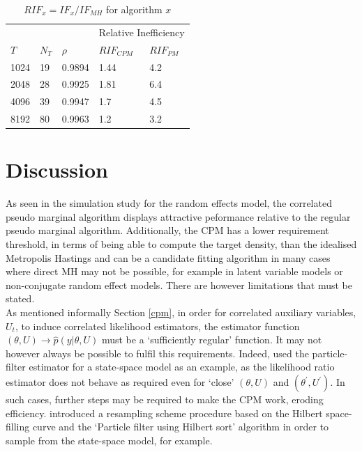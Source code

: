 \documentclass{article}
\begin{document}
\begin{table}[H]
\centering
\begin{tabular}{|l|ll|ll|}
\hline
     & \multicolumn{2}{l|}{} & \multicolumn{2}{l|}{Relative Inefficiency} \\
$T$  & $N_T$     & $\rho$    & $RIF_{CPM}$               & $RIF_{PM}$              \\ \hline
1024 & 19        & 0.9894    & 1.44                      & 4.2                     \\
2048 & 28        & 0.9925    & 1.81                      & 6.4                     \\
4096 & 39        & 0.9947    & 1.7                       & 4.5                     \\
8192 & 80        & 0.9963    & 1.2                       & 3.2                     \\ \hline
\end{tabular}
\caption{$RIF_x = IF_x/ IF_{MH}$ for algorithm $x$}
\label{tab:RIF}
\end{table}

  \section{Discussion}

As seen in the simulation study for the random effects model, the correlated pseudo marginal algorithm displays attractive peformance relative to the regular pseudo marginal algorithm. Additionally, the CPM has a lower requirement threshold, in terms of being able to compute the target density, than the idealised Metropolis Hastings and can be a candidate fitting algorithm in many cases where direct MH may not be possible, for example in latent variable models or non-conjugate random effect models. There are however limitations that must be stated.\\

  As mentioned informally Section \ref{cpm}, in order for correlated auxiliary variables, $U_t$, to induce correlated likelihood estimators, the estimator function $(\theta, U) \rightarrow \hat{p}(y | \theta, U)$ must be a `sufficiently regular' function. It may not however always be possible to fulfil this requirements. Indeed, \cite{cpmmDeligiannidis2015} used the particle-filter estimator for a state-space model as an example, as the likelihood ratio estimator does not behave as required even for `close' $(\theta, U)$ and $(\theta^\prime, U^\prime)$. In such cases, further steps may be required to make the CPM work, eroding efficiency. \cite{cpmmDeligiannidis2015} introduced a resampling scheme procedure based on the Hilbert space-filling curve and the `Particle filter using Hilbert sort' algorithm in order to sample from the state-space model, for example. \\
\end{document}
